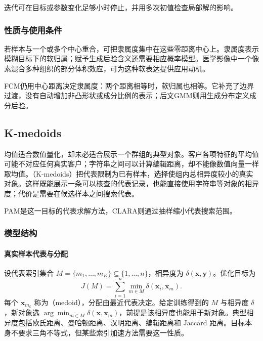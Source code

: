 迭代可在目标或参数变化足够小时停止，并用多次初值检查局部解的影响。

\subsubsection{性质与使用条件}

若样本与一个或多个中心重合，可把隶属度集中在这些零距离中心上。隶属度表示模糊目标下的软归属；赋予生成后验含义还需要相应概率模型。医学影像中一个像素混合多种组织的部分体积效应，可为这种软表达提供应用动机。

FCM仍用中心距离决定隶属度：两个距离相等时，软归属也相等。它补充了边界过渡，没有自动增加非凸形状或成分比例的表示；后文GMM则用生成分布定义成分后验。
\subsection{K-medoids}
\label{sec:clustering-kmedoids}

均值适合数值量化，却未必适合展示一个群组的典型对象。客户各项特征的平均值可能不对应任何真实客户；字符串之间可以计算编辑距离，却不能像数值向量一样取均值。（K-medoids）把代表限制为已有样本，选择使组内总相异度较小的真实对象。这样既能展示一条可以核查的代表记录，也能直接使用字符串等对象的相异度；代价是需要在候选样本之间搜索代表。

PAM是这一目标的代表求解方法，CLARA则通过抽样缩小代表搜索范围。

\subsubsection{模型结构}

\paragraph{真实样本代表与分配}

设代表索引集合 $M=\{m_1,\ldots,m_K\}\subseteq\{1,\ldots,n\}$，相异度为 $\delta(\bm{x},\bm{y})$。优化目标为
\begin{equation}
 J(M)=\sum_{i=1}^n\min_{m\in M}\delta(\bm{x}_i,\bm{x}_m).
 \label{eq:clustering-medoids}
\end{equation}
每个 $\bm{x}_{m_k}$ 称为（medoid），分配由最近代表决定。给定训练得到的 $M$ 与相异度 $\delta$，新对象选 $\arg\min_{m\in M}\delta(\bm{x},\bm{x}_m)$，前提是该相异度也能用于新对象。典型相异度包括欧氏距离、曼哈顿距离、汉明距离、编辑距离和 Jaccard 距离。目标本身不要求三角不等式，但某些索引加速方法需要这一性质。


